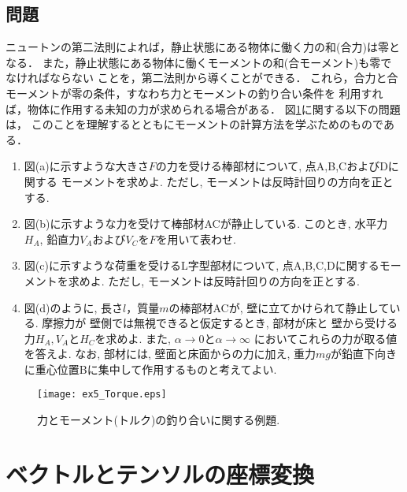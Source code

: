 \documentclass[10pt,a4j]{jbook}
\begin{document}
\subsection{問題}
ニュートンの第二法則によれば，静止状態にある物体に働く力の和(合力)は零となる．
また，静止状態にある物体に働くモーメントの和(合モーメント)も零でなければならない
ことを，第二法則から導くことができる．
これら，合力と合モーメントが零の条件，すなわち力とモーメントの釣り合い条件を
利用すれば，物体に作用する未知の力が求められる場合がある．
図\ref{fig:ex5_Torque}に関する以下の問題は，
このことを理解するとともにモーメントの計算方法を学ぶためのものである．
\begin{enumerate}
\item
図(a)に示すような大きさ$F$の力を受ける棒部材について, 点A,B,CおよびDに関する
モーメントを求めよ. ただし, モーメントは反時計回りの方向を正とする. 
\item
図(b)に示すような力を受けて棒部材ACが静止している. このとき, 水平力$H_A$, 
鉛直力$V_A$および$V_C$を$F$を用いて表わせ. 
\item
図(c)に示すような荷重を受けるL字型部材について, 点A,B,C,Dに関するモーメントを求めよ. 
ただし, モーメントは反時計回りの方向を正とする. 
\item
図(d)のように, 長さ$l$，質量$m$の棒部材ACが, 壁に立てかけられて静止している. 
摩擦力が 壁側では無視できると仮定するとき, 部材が床と
壁から受ける力$H_A, V_A$と$H_C$を求めよ. また, $\alpha\rightarrow 0$と$\alpha \rightarrow \infty$
においてこれらの力が取る値を答えよ. なお, 部材には, 壁面と床面からの力に加え, 
重力$mg$が鉛直下向きに重心位置Bに集中して作用するものと考えてよい. 
\end{enumerate}
\begin{figure}[h]
	\begin{center}
	\texttt{[image: ex5\_Torque.eps]} 
	\end{center}
	\caption{力とモーメント(トルク)の釣り合いに関する例題.} 
	\label{fig:ex5_Torque}
\end{figure}
\section{ベクトルとテンソルの座標変換}
\end{document}
